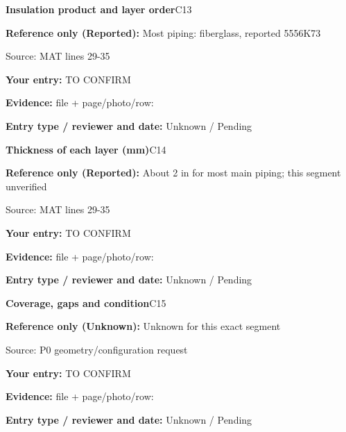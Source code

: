 \documentclass[11pt]{article}
\begin{document}
\begin{minipage}{\textwidth}\small
{\color{navy}\bfseries Insulation product and layer order}\hfill C13\par
\colorbox{pale}{\parbox{\dimexpr\linewidth-2\fboxsep\relax}{
\textbf{Reference only (Reported):} Most piping: fiberglass, reported 5556K73\par
{\footnotesize Source: MAT lines 29-35}}}\par
\textbf{Your entry:} {\color{muted}TO CONFIRM}\enspace\hrulefill\par
{\footnotesize\textbf{Evidence:} file + page/photo/row: \hrulefill\par
\textbf{Entry type / reviewer and date:} Unknown / Pending\par
}\end{minipage}\par\vspace{5pt}
\begin{minipage}{\textwidth}\small
{\color{navy}\bfseries Thickness of each layer (mm)}\hfill C14\par
\colorbox{pale}{\parbox{\dimexpr\linewidth-2\fboxsep\relax}{
\textbf{Reference only (Reported):} About 2 in for most main piping; this segment unverified\par
{\footnotesize Source: MAT lines 29-35}}}\par
\textbf{Your entry:} {\color{muted}TO CONFIRM}\enspace\hrulefill\par
{\footnotesize\textbf{Evidence:} file + page/photo/row: \hrulefill\par
\textbf{Entry type / reviewer and date:} Unknown / Pending\par
}\end{minipage}\par\vspace{5pt}
\begin{minipage}{\textwidth}\small
{\color{navy}\bfseries Coverage, gaps and condition}\hfill C15\par
\colorbox{pale}{\parbox{\dimexpr\linewidth-2\fboxsep\relax}{
\textbf{Reference only (Unknown):} Unknown for this exact segment\par
{\footnotesize Source: P0 geometry/configuration request}}}\par
\textbf{Your entry:} {\color{muted}TO CONFIRM}\enspace\hrulefill\par
{\footnotesize\textbf{Evidence:} file + page/photo/row: \hrulefill\par
\textbf{Entry type / reviewer and date:} Unknown / Pending\par
}\end{minipage}\par\vspace{5pt}
\end{document}
